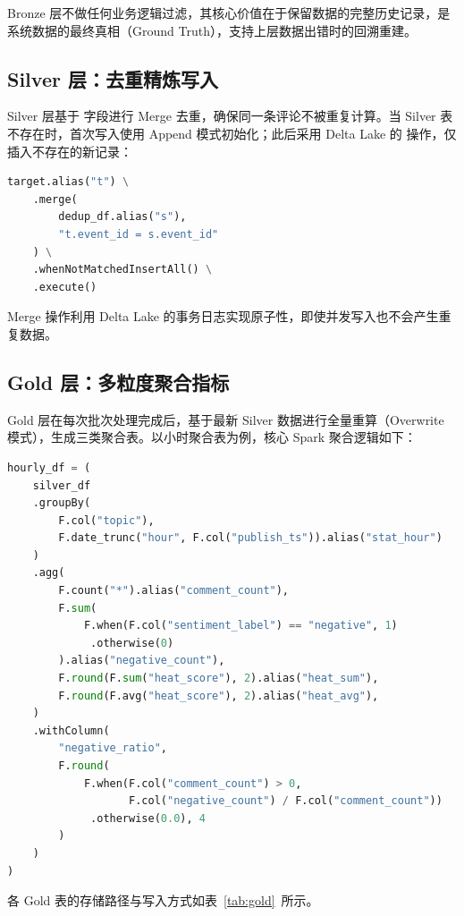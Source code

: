 Bronze 层不做任何业务逻辑过滤，其核心价值在于保留数据的完整历史记录，是系统数据的最终真相（Ground Truth），支持上层数据出错时的回溯重建。

\subsection{Silver 层：去重精炼写入}

Silver 层基于  字段进行 Merge 去重，确保同一条评论不被重复计算。当 Silver 表不存在时，首次写入使用 Append 模式初始化；此后采用 Delta Lake 的  操作，仅插入不存在的新记录：

\begin{lstlisting}[language=Python, caption={Silver 层 Merge 去重写入}, label={lst:silver}]
target.alias("t") \
    .merge(
        dedup_df.alias("s"),
        "t.event_id = s.event_id"
    ) \
    .whenNotMatchedInsertAll() \
    .execute()
\end{lstlisting}

Merge 操作利用 Delta Lake 的事务日志实现原子性，即使并发写入也不会产生重复数据。

\subsection{Gold 层：多粒度聚合指标}

Gold 层在每次批次处理完成后，基于最新 Silver 数据进行全量重算（Overwrite 模式），生成三类聚合表。以小时聚合表为例，核心 Spark 聚合逻辑如下：

\begin{lstlisting}[language=Python, caption={Gold Hourly 小时聚合}, label={lst:gold}]
hourly_df = (
    silver_df
    .groupBy(
        F.col("topic"),
        F.date_trunc("hour", F.col("publish_ts")).alias("stat_hour")
    )
    .agg(
        F.count("*").alias("comment_count"),
        F.sum(
            F.when(F.col("sentiment_label") == "negative", 1)
             .otherwise(0)
        ).alias("negative_count"),
        F.round(F.sum("heat_score"), 2).alias("heat_sum"),
        F.round(F.avg("heat_score"), 2).alias("heat_avg"),
    )
    .withColumn(
        "negative_ratio",
        F.round(
            F.when(F.col("comment_count") > 0,
                   F.col("negative_count") / F.col("comment_count"))
             .otherwise(0.0), 4
        )
    )
)
\end{lstlisting}

各 Gold 表的存储路径与写入方式如表~\ref{tab:gold}~所示。


